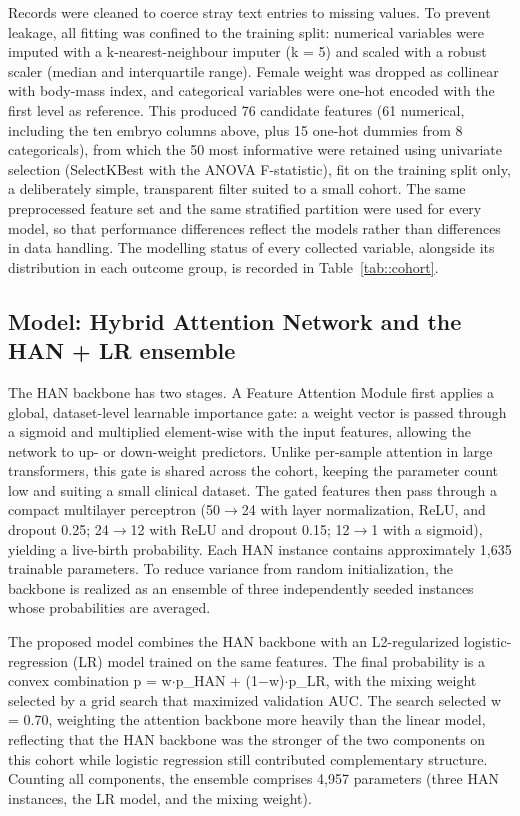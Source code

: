 \documentclass[12pt,a4paper]{article}
\begin{document}
Records were cleaned to coerce stray text entries to missing values. To prevent leakage, all fitting was confined to the training split: numerical variables were imputed with a k-nearest-neighbour imputer (k = 5) and scaled with a robust scaler (median and interquartile range). Female weight was dropped as collinear with body-mass index, and categorical variables were one-hot encoded with the first level as reference. This produced 76 candidate features (61 numerical, including the ten embryo columns above, plus 15 one-hot dummies from 8 categoricals), from which the 50 most informative were retained using univariate selection (SelectKBest with the ANOVA F-statistic), fit on the training split only, a deliberately simple, transparent filter suited to a small cohort. The same preprocessed feature set and the same stratified partition were used for every model, so that performance differences reflect the models rather than differences in data handling. The modelling status of every collected variable, alongside its distribution in each outcome group, is recorded in Table~\ref{tab::cohort}.

\subsection*{Model: Hybrid Attention Network and the HAN + LR ensemble}

The HAN backbone has two stages. A Feature Attention Module first applies a global, dataset-level learnable importance gate: a weight vector is passed through a sigmoid and multiplied element-wise with the input features, allowing the network to up- or down-weight predictors. Unlike per-sample attention in large transformers, this gate is shared across the cohort, keeping the parameter count low and suiting a small clinical dataset. The gated features then pass through a compact multilayer perceptron (50$\rightarrow$24 with layer normalization, ReLU, and dropout 0.25; 24$\rightarrow$12 with ReLU and dropout 0.15; 12$\rightarrow$1 with a sigmoid), yielding a live-birth probability. Each HAN instance contains approximately 1,635 trainable parameters. To reduce variance from random initialization, the backbone is realized as an ensemble of three independently seeded instances whose probabilities are averaged.

The proposed model combines the HAN backbone with an L2-regularized logistic-regression (LR) model trained on the same features. The final probability is a convex combination p = w$\cdot$p\_HAN + (1$-$w)$\cdot$p\_LR, with the mixing weight selected by a grid search that maximized validation AUC. The search selected w = 0.70, weighting the attention backbone more heavily than the linear model, reflecting that the HAN backbone was the stronger of the two components on this cohort while logistic regression still contributed complementary structure. Counting all components, the ensemble comprises 4,957 parameters (three HAN instances, the LR model, and the mixing weight).
\end{document}
